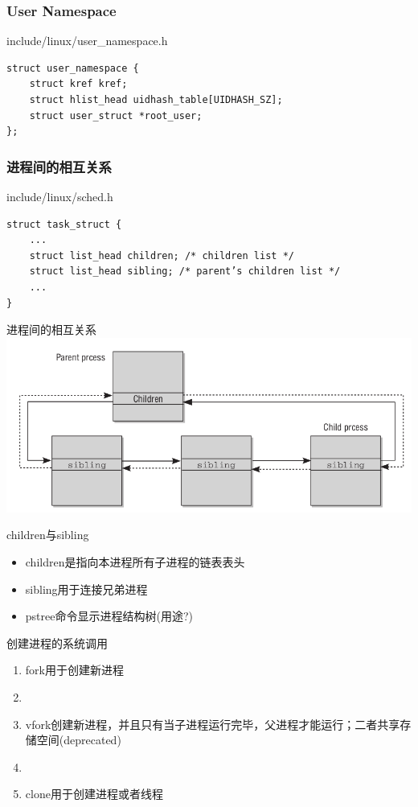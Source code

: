 \documentclass[xcolor=svgnames]{beamer}
\begin{document}
\begin{CJK*}{UTF8}{gbsn}
\begin{frame}[fragile]
\frametitle{User Namespace}
\begin{block}{include/linux/user\_namespace.h}
\begin{verbatim}
struct user_namespace {
    struct kref kref;
    struct hlist_head uidhash_table[UIDHASH_SZ];
    struct user_struct *root_user;
};
\end{verbatim}
\end{block}
\end{frame}

\begin{frame}[fragile]
\frametitle{进程间的相互关系}
\begin{block}{include/linux/sched.h}
\begin{verbatim}
struct task_struct {
    ...
    struct list_head children; /* children list */
    struct list_head sibling; /* parent’s children list */
    ...
}
\end{verbatim}
\end{block}
\end{frame}

\begin{frame}{进程间的相互关系}
\includegraphics[width=1.0\textwidth]{parent.png}
\begin{block}{children与sibling}
\begin{itemize}
\item children是指向本进程所有子进程的链表表头
\item sibling用于连接兄弟进程
\item pstree命令显示进程结构树(用途?)
\end{itemize}
\end{block}
\end{frame}

\begin{frame}{创建进程的系统调用}
\begin{enumerate}
\item fork用于创建新进程
\item[]
\item vfork创建新进程，并且只有当子进程运行完毕，父进程才能运行；二者共享存储空间(deprecated)
\item[]
\item clone用于创建进程或者线程


\end{enumerate}
\end{frame}
\end{CJK*}
\end{document}
